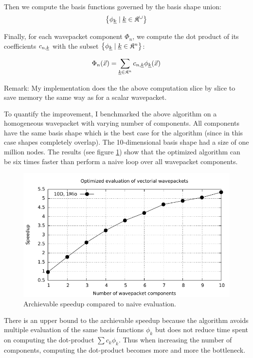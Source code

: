 \documentclass{article}
\begin{document}
Then we compute the basis functions governed by the basis shape union:
\[
\left\{\phi_{\underline{k}} \;|\;\underline{k} \in \mathfrak{K}^{\cup}\right\}
\]

Finally, for each wavepacket component \(\Phi_n\),
we compute the dot product of its coefficients \(c_{n,\underline{k}}\)
with the subset \(\left\{\phi_{\underline{k}}\;|\; \underline{k} \in \mathfrak{K}^n\right\}\):

\[
\Phi_n(\vec{x})=\sum_{\underline{k} \in \mathfrak{K}^n} c_{n,\underline{k}} \phi_{\underline{k}}(\vec{x})
\]

Remark: My implementation does the the above computation slice by slice to save memory
the same way as for a scalar wavepacket.

To quantify the improvement, I benchmarked the above algorithm on a homogeneous wavepacket with
varying number of components. All components have the same basis shape which is
the best case for the algorithm (since in this case shapes completely overlap).
The 10-dimensional basis shape had a size of one million nodes.
The results (see figure \ref{fig:hawp_homogen_evaluation_speedup}) show that the
optimized algorithm can be six times faster than perform a naive loop over all
wavepacket components.

\begin{figure}[H]
  \centering
  \includegraphics[width=1.0\textwidth]{plots/hawp_eval_homogen_speedup}
  \caption{Archievable speedup compared to naive evaluation.}
  \label{fig:hawp_homogen_evaluation_speedup}
\end{figure}

There is an upper bound to the archievable speedup because the algorithm
avoids multiple evaluation of the same basis functions \(\phi_k\) but does not reduce
time spent on computing the dot-product \(\sum c_k\phi_k\).
Thus when increasing the number of components, computing the dot-product becomes
more and more the bottleneck.
\end{document}
